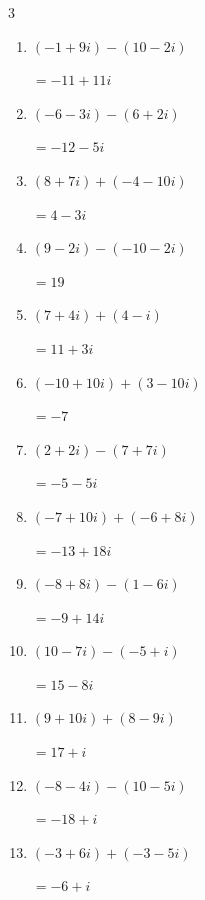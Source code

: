 \begin{multicols}{3}
\begin{enumerate}
  \itemsep=1pt
  \item $\displaystyle (-1+9i) - (10-2i)$

        $\displaystyle =-11+11i$

  \item $\displaystyle (-6-3i) - (6+2i)$

        $\displaystyle =-12-5i$

  \item $\displaystyle (8+7i) + (-4-10i)$

        $\displaystyle =4-3i$

  \item $\displaystyle (9-2i) - (-10-2i)$

        $\displaystyle =19$

  \item $\displaystyle (7+4i) + (4-i)$

        $\displaystyle =11+3i$

  \item $\displaystyle (-10+10i) + (3-10i)$

        $\displaystyle =-7$

  \item $\displaystyle (2+2i) - (7+7i)$

        $\displaystyle =-5-5i$

  \item $\displaystyle (-7+10i) + (-6+8i)$

        $\displaystyle =-13+18i$

  \item $\displaystyle (-8+8i) - (1-6i)$

        $\displaystyle =-9+14i$

  \item $\displaystyle (10-7i) - (-5+i)$

        $\displaystyle =15-8i$

  \item $\displaystyle (9+10i) + (8-9i)$

        $\displaystyle =17+i$

  \item $\displaystyle (-8-4i) - (10-5i)$

        $\displaystyle =-18+i$

  \item $\displaystyle (-3+6i) + (-3-5i)$

        $\displaystyle =-6+i$


\end{enumerate}
\end{multicols}
